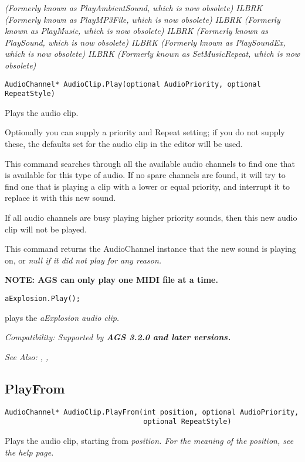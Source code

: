 \it{(Formerly known as PlayAmbientSound, which is now obsolete)} ILBRK
\it{(Formerly known as PlayMP3File, which is now obsolete)} ILBRK
\it{(Formerly known as PlayMusic, which is now obsolete)} ILBRK
\it{(Formerly known as PlaySound, which is now obsolete)} ILBRK
\it{(Formerly known as PlaySoundEx, which is now obsolete)} ILBRK
\it{(Formerly known as SetMusicRepeat, which is now obsolete)}

\begin{verbatim}
AudioChannel* AudioClip.Play(optional AudioPriority, optional RepeatStyle)
\end{verbatim}
Plays the audio clip.

Optionally you can supply a priority and Repeat setting; if you do not supply these,
the defaults set for the audio clip in the editor will be used.

This command searches through all the available audio channels to find one that is
available for this type of audio. If no spare channels are found, it will try to find
one that is playing a clip with a lower or equal priority, and interrupt it to replace
it with this new sound.

If all audio channels are busy playing higher priority sounds, then this new audio clip
will not be played.

This command returns the AudioChannel instance that the new sound is playing on, or
\it{null} if it did not play for any reason.

\bf{NOTE:} AGS can only play one MIDI file at a time.

\begin{verbatim}
aExplosion.Play();
\end{verbatim}
plays the \it{aExplosion} audio clip.

\it{Compatibility:} Supported by \bf{AGS 3.2.0} and later versions.

\it{See Also:} ,
,


\subsection{PlayFrom}\label{AudioClip.PlayFrom}%

\begin{verbatim}
AudioChannel* AudioClip.PlayFrom(int position, optional AudioPriority,
                                 optional RepeatStyle)
\end{verbatim}
Plays the audio clip, starting from \it{position}. For the meaning of the position,
see the  help page.

